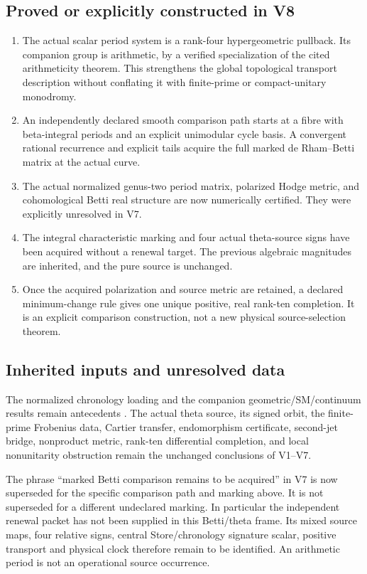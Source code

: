 \documentclass[11pt]{article}
\theoremstyle{definition}
\theoremstyle{remark}
\begin{document}
\subsection{Proved or explicitly constructed in V8}
\begin{enumerate}[label=\textup{(P8.\arabic*)},leftmargin=3.6em]
\item The actual scalar period system is a rank-four hypergeometric pullback.
      Its companion group is arithmetic, by a verified specialization of
      the cited arithmeticity theorem. This strengthens the global
      topological transport description without conflating it with finite-prime
      or compact-unitary monodromy.
\item An independently declared smooth comparison path starts at a fibre
      with beta-integral periods and an explicit unimodular cycle basis.
      A convergent rational recurrence and explicit tails acquire the full
      marked de Rham--Betti matrix at the actual curve.
\item The actual normalized genus-two period matrix, polarized Hodge metric,
      and cohomological Betti real structure are now numerically certified.
      They were explicitly unresolved in V7.
\item The integral characteristic marking and four actual theta-source signs
      have been acquired without a renewal target. The previous algebraic
      magnitudes are inherited, and the pure source is unchanged.
\item Once the acquired polarization and source metric are retained, a
      declared minimum-change rule gives one unique positive, real rank-ten
      completion. It is an explicit comparison construction, not a new
      physical source-selection theorem.
\end{enumerate}

\subsection{Inherited inputs and unresolved data}
The normalized chronology loading and the companion geometric/SM/continuum
results remain antecedents \cite{GT77,Arithmetic,Spacetime,Spectral,Duality,Variational}.
The actual theta source, its signed orbit, the finite-prime Frobenius data,
Cartier transfer, endomorphism certificate, second-jet bridge, nonproduct
metric, rank-ten differential completion, and local nonunitarity obstruction
remain the unchanged conclusions of V1--V7.

The phrase ``marked Betti comparison remains to be acquired'' in V7 is now
superseded for the specific comparison path and marking above. It is not
superseded for a different undeclared marking. In particular the independent
renewal packet has not been supplied in this Betti/theta frame. Its mixed
source maps, four relative signs, central Store/chronology signature scalar,
positive transport and physical clock therefore remain to be identified.
An arithmetic period is not an operational source occurrence.
\end{document}
